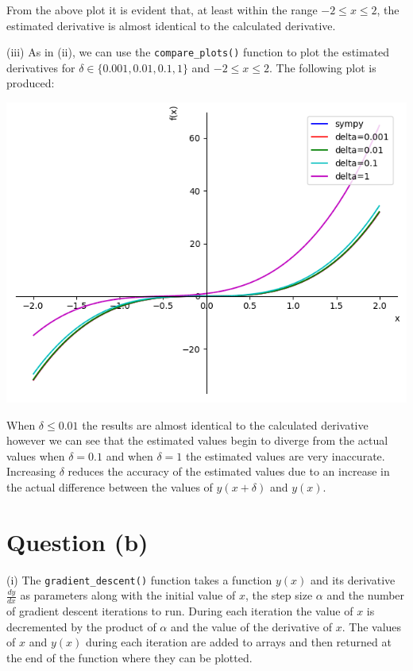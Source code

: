 \documentclass[12pt]{article}
\begin{document}
From the above plot it is evident that, at least within the range $-2 \leq x \leq 2$, the estimated derivative is almost identical to the calculated derivative.

\noindent (iii) As in (ii), we can use the \texttt{compare\_plots()} function to plot the estimated derivatives for $\delta \in \{0.001, 0.01, 0.1, 1\}$ and $-2 \leq x \leq 2$. The following plot is produced:

\begin{center}
    \includegraphics[scale=0.55]{figs/a/a_iii.png}
\end{center}

When $\delta \leq 0.01$ the results are almost identical to the calculated derivative however we can see that the estimated values begin to diverge from the actual values when $\delta=0.1$ and when $\delta=1$ the estimated values are very inaccurate. Increasing $\delta$ reduces the accuracy of the estimated values due to an increase in the actual difference between the values of $y(x + \delta)$ and $y(x)$.

\section*{Question (b)}

\noindent (i) The \texttt{gradient\_descent()} function takes a function $y(x)$ and its derivative $\frac{dy}{dx}$ as parameters along with the initial value of $x$, the step size $\alpha$ and the number of gradient descent iterations to run. During each iteration the value of $x$ is decremented by the product of $\alpha$ and the value of the derivative of $x$. The values of $x$ and $y(x)$ during each iteration are added to arrays and then returned at the end of the function where they can be plotted.
\end{document}
